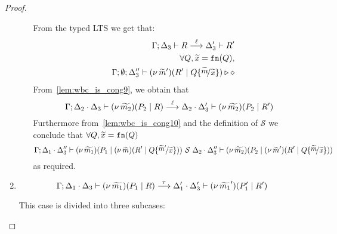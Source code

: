 \begin{proof}
\begin{enumerate}
\begin{enumerate}[i.]
					\noi From the typed LTS we get that:
					\begin{eqnarray}
						& &	\horel{\Gamma}{\Delta_3}{R}{\by{\ell}}{\Delta_3'}{R'}
							\label{lem:wbc_is_cong9} \\
						& &	\forall Q, \widetilde{x} = \fn{Q}, \nonumber\\
						& &	\Gamma; \emptyset; \Delta_3'' \proves \newsp{\widetilde{m}'}{R' \Par Q \subst{\widetilde{m}}{\widetilde{x}}} \hastype \Proc
							\label{lem:wbc_is_cong10}
					\end{eqnarray}
					\noi From~\eqref{lem:wbc_is_cong9}, we obtain that
					\[
						\Gamma; \Delta_2 \cdot \Delta_3 \vdash (\nu\, \widetilde{m_2})(P_2 \;|\; R) \stackrel{\ell}{\longrightarrow} \Delta_2 \cdot \Delta_3' \vdash (\nu\, \widetilde{m_2})(P_2 \;|\; R')
					\]
					\noi Furthermore from~\eqref{lem:wbc_is_cong10} and the definition of $\mathcal{S}$ we conclude that
					$\forall Q, \widetilde{x} = \mathtt{fn}(Q)$
					\[
						\horel{\Gamma}{\Delta_1 \cat \Delta_3''}{\newsp{\widetilde{m_1}}{P_1 \Par \newsp{\widetilde{m}}{R' \Par Q \subst{\widetilde{m}'}{\widetilde{x}}}}}
						{\ \mathcal{S}\ }
						{\Delta_2 \cat \Delta_3''}{\newsp{\widetilde{m_2}}{P_2 \Par \newsp{\widetilde{m}'}{R' \Par Q \subst{\widetilde{m}}{\widetilde{x}}}}}
					\]
					\noi as required.
			\end{enumerate}


	\item
			\[
				\Gamma; \Delta_1 \cdot \Delta_3 \vdash (\nu\, \widetilde{m_1})(P_1 \;|\; R) \stackrel{\tau}{\longrightarrow} \Delta_1' \cdot \Delta_3' \vdash (\nu\, \widetilde{m_1}')(P_1' \;|\; R')
			\]

			\noi This case is divided into three subcases:

			\begin{enumerate}[i.]


\end{enumerate}
\end{enumerate}
\end{proof}

